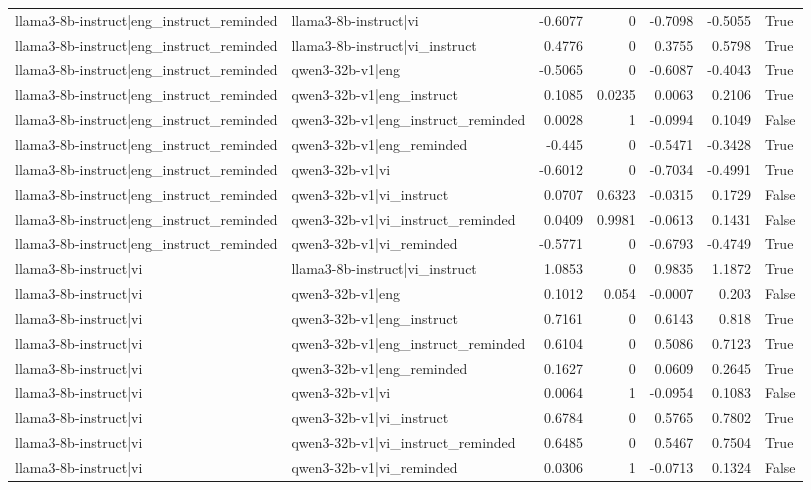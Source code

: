 \begin{table}
\begin{tabular}{l l r r r r l}
llama3-8b-instruct|eng_instruct_reminded & llama3-8b-instruct|vi & -0.6077 & 0 & -0.7098 & -0.5055 & True \\
llama3-8b-instruct|eng_instruct_reminded & llama3-8b-instruct|vi_instruct & 0.4776 & 0 & 0.3755 & 0.5798 & True \\
llama3-8b-instruct|eng_instruct_reminded & qwen3-32b-v1|eng & -0.5065 & 0 & -0.6087 & -0.4043 & True \\
llama3-8b-instruct|eng_instruct_reminded & qwen3-32b-v1|eng_instruct & 0.1085 & 0.0235 & 0.0063 & 0.2106 & True \\
llama3-8b-instruct|eng_instruct_reminded & qwen3-32b-v1|eng_instruct_reminded & 0.0028 & 1 & -0.0994 & 0.1049 & False \\
llama3-8b-instruct|eng_instruct_reminded & qwen3-32b-v1|eng_reminded & -0.445 & 0 & -0.5471 & -0.3428 & True \\
llama3-8b-instruct|eng_instruct_reminded & qwen3-32b-v1|vi & -0.6012 & 0 & -0.7034 & -0.4991 & True \\
llama3-8b-instruct|eng_instruct_reminded & qwen3-32b-v1|vi_instruct & 0.0707 & 0.6323 & -0.0315 & 0.1729 & False \\
llama3-8b-instruct|eng_instruct_reminded & qwen3-32b-v1|vi_instruct_reminded & 0.0409 & 0.9981 & -0.0613 & 0.1431 & False \\
llama3-8b-instruct|eng_instruct_reminded & qwen3-32b-v1|vi_reminded & -0.5771 & 0 & -0.6793 & -0.4749 & True \\
llama3-8b-instruct|vi & llama3-8b-instruct|vi_instruct & 1.0853 & 0 & 0.9835 & 1.1872 & True \\
llama3-8b-instruct|vi & qwen3-32b-v1|eng & 0.1012 & 0.054 & -0.0007 & 0.203 & False \\
llama3-8b-instruct|vi & qwen3-32b-v1|eng_instruct & 0.7161 & 0 & 0.6143 & 0.818 & True \\
llama3-8b-instruct|vi & qwen3-32b-v1|eng_instruct_reminded & 0.6104 & 0 & 0.5086 & 0.7123 & True \\
llama3-8b-instruct|vi & qwen3-32b-v1|eng_reminded & 0.1627 & 0 & 0.0609 & 0.2645 & True \\
llama3-8b-instruct|vi & qwen3-32b-v1|vi & 0.0064 & 1 & -0.0954 & 0.1083 & False \\
llama3-8b-instruct|vi & qwen3-32b-v1|vi_instruct & 0.6784 & 0 & 0.5765 & 0.7802 & True \\
llama3-8b-instruct|vi & qwen3-32b-v1|vi_instruct_reminded & 0.6485 & 0 & 0.5467 & 0.7504 & True \\
llama3-8b-instruct|vi & qwen3-32b-v1|vi_reminded & 0.0306 & 1 & -0.0713 & 0.1324 & False \\

\end{tabular}
\end{table}
